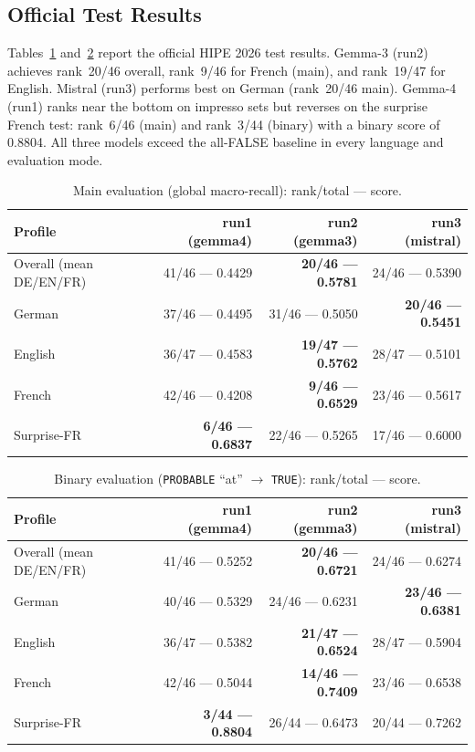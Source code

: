 \documentclass[
]{ceurart}
\theoremstyle{definition}
\begin{document}
\subsection{Official Test Results}

Tables~\ref{tab:test-main} and~\ref{tab:test-binary} report the official HIPE 2026 test results.
Gemma-3 (run2) achieves rank~20/46 overall, rank~9/46 for French (main), and rank~19/47 for English.
Mistral (run3) performs best on German (rank~20/46 main).
Gemma-4 (run1) ranks near the bottom on impresso sets but reverses on the surprise French test: rank~6/46 (main) and rank~3/44 (binary) with a binary score of 0.8804.
All three models exceed the all-FALSE baseline in every language and evaluation mode.

\begin{table}[t]
\centering
\caption{Main evaluation (global macro-recall): rank/total --- score.}
\label{tab:test-main}
\setlength{\tabcolsep}{4pt}
\begin{tabular}{lrrr}
\toprule
\textbf{Profile} & \textbf{run1 (gemma4)} & \textbf{run2 (gemma3)} & \textbf{run3 (mistral)} \\
\midrule
Overall (mean DE/EN/FR) & 41/46 --- 0.4429 & \textbf{20/46 --- 0.5781} & 24/46 --- 0.5390 \\
German                  & 37/46 --- 0.4495 & 31/46 --- 0.5050          & \textbf{20/46 --- 0.5451} \\
English                 & 36/47 --- 0.4583 & \textbf{19/47 --- 0.5762} & 28/47 --- 0.5101 \\
French                  & 42/46 --- 0.4208 & \textbf{9/46 --- 0.6529}  & 23/46 --- 0.5617 \\
Surprise-FR             & \textbf{6/46 --- 0.6837}  & 22/46 --- 0.5265 & 17/46 --- 0.6000 \\
\bottomrule
\end{tabular}
\end{table}

\begin{table}[t]
\centering
\caption{Binary evaluation (\texttt{PROBABLE} ``at'' $\to$ \texttt{TRUE}): rank/total --- score.}
\label{tab:test-binary}
\setlength{\tabcolsep}{4pt}
\begin{tabular}{lrrr}
\toprule
\textbf{Profile} & \textbf{run1 (gemma4)} & \textbf{run2 (gemma3)} & \textbf{run3 (mistral)} \\
\midrule
Overall (mean DE/EN/FR) & 41/46 --- 0.5252 & \textbf{20/46 --- 0.6721} & 24/46 --- 0.6274 \\
German                  & 40/46 --- 0.5329 & 24/46 --- 0.6231          & \textbf{23/46 --- 0.6381} \\
English                 & 36/47 --- 0.5382 & \textbf{21/47 --- 0.6524} & 28/47 --- 0.5904 \\
French                  & 42/46 --- 0.5044 & \textbf{14/46 --- 0.7409} & 23/46 --- 0.6538 \\
Surprise-FR             & \textbf{3/44 --- 0.8804}  & 26/44 --- 0.6473 & 20/44 --- 0.7262 \\
\bottomrule
\end{tabular}
\end{table}
\end{document}
